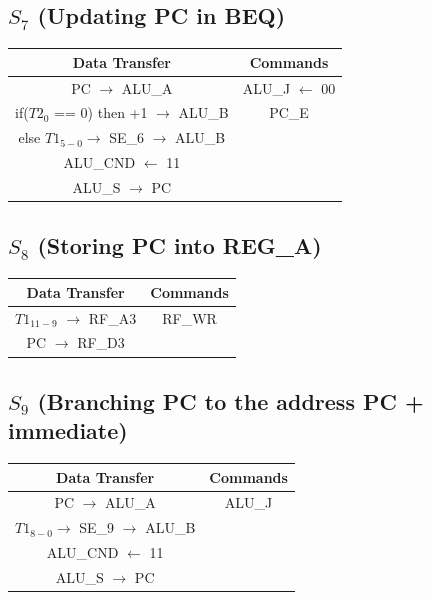 \documentclass[]{report}
\begin{document}
        \subsection*{$S_7$ (Updating PC in BEQ)} %
        \begin{center}
            \begin{tabular}{|c|c|}
                \hline
                Data Transfer & Commands \\
                \hline
                PC $\to$ ALU\_A & ALU\_J $\leftarrow$ 00\\
                if($T2_0$ == 0) then +1 $\to$ ALU\_B & PC\_E\\
                else $T1_{5-0} \to$ SE\_6 $\to$ ALU\_B & \\
                ALU\_CND $\leftarrow$ 11 & \\
                ALU\_S $\to$ PC & \\
                \hline
            \end{tabular}
        \end{center}
        \subsection*{$S_8$ (Storing PC into REG\_A)} %
        \begin{center}
            \begin{tabular}{|c|c|}
                \hline
                Data Transfer & Commands \\
                \hline
                $T1_{11-9}$ $\to$ RF\_A3 & RF\_WR\\
                PC $\to$ RF\_D3 & \\
                \hline
            \end{tabular}
        \end{center}
        \subsection*{$S_9$ (Branching PC to the address PC + immediate)} %
        \begin{center}
            \begin{tabular}{|c|c|}
                \hline
                Data Transfer & Commands \\
                \hline
                PC $\to$ ALU\_A & ALU\_J\\
                $T1_{8-0} \to$ SE\_9 $\to$ ALU\_B & \\
                ALU\_CND $\leftarrow$ 11 & \\
                ALU\_S $\to$ PC & \\
                \hline
            \end{tabular}
        \end{center}
\end{document}
